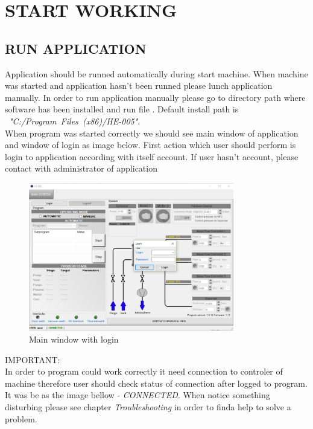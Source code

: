 \chapter{START WORKING} \label{Start working}
\thispagestyle{fancy}

\section{RUN APPLICATION}

Application \textit{ \SoftwareName} should be runned automatically during start machine. When machine was started and application hasn't been runned please lunch application manually. In order to run application manually please go to directory path where software has been installed and run file \textit{ \ExecuteFileName} . Default install path is \mbox{ \textit{  "C:/Program Files (x86)/HE-005"}.}  \\

When program was started correctly we should see main window of application and window of login as image below. First action which user should perform is login to application according with itself account. If user hasn't account, please contact with administrator of application

	\begin{figure}[!h] 
	\centering \includegraphics[width=0.8\textwidth]{Graphic/StartWorking/MainWindowWithLogin.png}	
	\caption{Main window with login}
	\label{main_window_with_login}
	\end{figure}
	\FloatBarrier

IMPORTANT: \\
In order to program could work correctly it need connection to controler of machine therefore user should check status of connection after logged to program. It was be as the image bellow - \textit{CONNECTED}. When notice something disturbing please see chapter \textit{Troubleshooting} in order to finda help to solve a problem.

